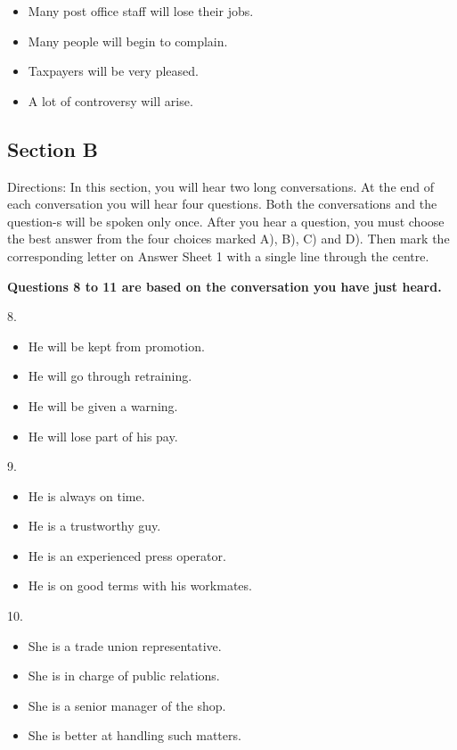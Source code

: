 \documentclass[UTF8,11pt]{ctexart}
\begin{document}
\begin{itemize}[leftmargin=2em,itemsep=.2em,topsep=.4em]\item[A.] Many post office staff will lose their jobs.
\item[B.] Many people will begin to complain.
\item[C.] Taxpayers will be very pleased.
\item[D.] A lot of controversy will arise.
\end{itemize}

\subsection*{\textbf{Section B}}


Directions: In this section, you will hear two long conversations. At the end of each conversation you will hear four questions. Both the conversations and the question-s will be spoken only once. After you hear a question, you must choose the best answer from the four choices marked A), B), C) and D). Then mark the corresponding letter on Answer Sheet 1 with a single line through the centre.


\textbf{Questions 8 to 11 are based on the conversation you have just heard.}


8.


\begin{itemize}[leftmargin=2em,itemsep=.2em,topsep=.4em]\item[A.] He will be kept from promotion.
\item[B.] He will go through retraining.
\item[C.] He will be given a warning.
\item[D.] He will lose part of his pay.
\end{itemize}

9.


\begin{itemize}[leftmargin=2em,itemsep=.2em,topsep=.4em]\item[A.] He is always on time.
\item[B.] He is a trustworthy guy.
\item[C.] He is an experienced press operator.
\item[D.] He is on good terms with his workmates.
\end{itemize}

10.


\begin{itemize}[leftmargin=2em,itemsep=.2em,topsep=.4em]\item[A.] She is a trade union representative.
\item[B.] She is in charge of public relations.
\item[C.] She is a senior manager of the shop.
\item[D.] She is better at handling such matters.
\end{itemize}
\end{document}
